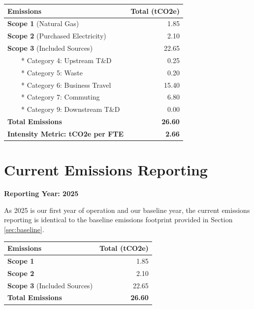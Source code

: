 \documentclass[11pt, a4paper]{article}
\begin{document}
\begin{table}[H]
    \centering
    \renewcommand{\arraystretch}{1.5} %
    \begin{tabularx}{\textwidth}{@{} X r @{}}
        \toprule
        \textbf{Emissions} & \textbf{Total (tCO2e)} \\
        \midrule
        \textbf{Scope 1} (Natural Gas) & 1.85 \\
        \textbf{Scope 2} (Purchased Electricity) & 2.10 \\
        \textbf{Scope 3} (Included Sources) & 22.65 \\
        ~~~~* Category 4: Upstream T\&D & 0.25 \\
        ~~~~* Category 5: Waste & 0.20 \\
        ~~~~* Category 6: Business Travel & 15.40 \\
        ~~~~* Category 7: Commuting & 6.80 \\
        ~~~~* Category 9: Downstream T\&D & 0.00 \\
        \midrule
        \textbf{Total Emissions} & \textbf{26.60} \\
        \textbf{Intensity Metric: tCO2e per FTE} & \textbf{2.66} \\
        \bottomrule
    \end{tabularx}
\end{table}

\section{Current Emissions Reporting}
\label{sec:current_reporting}

\textbf{Reporting Year: 2025}

As 2025 is our first year of operation and our baseline year, the current emissions reporting is identical to the baseline emissions footprint provided in Section \ref{sec:baseline}.

\begin{table}[H]
    \centering
    \renewcommand{\arraystretch}{1.5}
    \begin{tabularx}{\textwidth}{@{} X r @{}}
        \toprule
        \textbf{Emissions} & \textbf{Total (tCO2e)} \\
        \midrule
        \textbf{Scope 1} & 1.85 \\
        \textbf{Scope 2} & 2.10 \\
        \textbf{Scope 3} (Included Sources) & 22.65 \\
        \midrule
        \textbf{Total Emissions} & \textbf{26.60} \\
        \bottomrule
    \end{tabularx}
\end{table}
\end{document}
